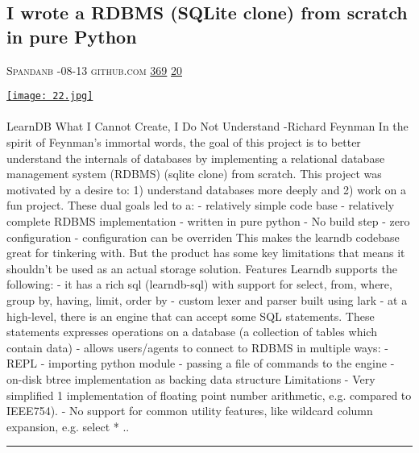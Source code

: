 \documentclass[10pt,a4paper]{article}
\begin{document}
\begin{multicols}{2}
\begin{minipage}{\linewidth}
\subsection{I wrote a RDBMS (SQLite clone) from scratch in pure Python}
\textsc{\footnotesize
{\scriptsize\faUser}\space 
Spandanb 
{\scriptsize\faCalendar}-08-13 
{\scriptsize\faGithub}\space 
github.com 
{\scriptsize\faThumbsOUp}\space 
\href{http://news.ycombinator.com/item?id=37114141\&utm\_term=comment}{369} 
{\scriptsize\faComments}\space 
\href{http://news.ycombinator.com/item?id=37114141\&utm\_term=comment}{20} 
}
\par\medskip\noindent
\href{https://github.com/spandanb/learndb-py?utm\_source=hackernewsletter\&utm\_medium=email\&utm\_term=code}{
    \texttt{[image: 22.jpg]}
}
\end{minipage}
\paragraph{}
LearnDB
What I Cannot Create, I Do Not Understand -Richard Feynman
In the spirit of Feynman's immortal words, the goal of this project is to better understand the internals of databases by implementing a relational database management system (RDBMS) (sqlite clone) from scratch.
This project was motivated by a desire to: 1) understand databases more deeply and 2) work on a fun project. These dual goals led to a:
- relatively simple code base
- relatively complete RDBMS implementation
- written in pure python
- No build step
- zero configuration
- configuration can be overriden
This makes the learndb codebase great for tinkering with. But the product has some key limitations that means it shouldn't be used as an actual storage solution.
Features
Learndb supports the following:
- it has a rich sql (learndb-sql) with support for
select, from, where, group by, having, limit, order by
- custom lexer and parser built using
lark
- at a high-level, there is an engine that can accept some SQL statements. These statements expresses operations on a database (a collection of tables which contain data)
- allows users/agents to connect to RDBMS in multiple ways:
- REPL
- importing python module
- passing a file of commands to the engine
- on-disk btree implementation as backing data structure
Limitations
- Very simplified 1 implementation of floating point number arithmetic, e.g. compared to IEEE754).
- No support for common utility features, like wildcard column expansion, e.g.
select * ..
\par\noindent\textcolor{red}{\rule{\linewidth}{0.2mm}}
\vfill
\null
\noindent\begin{minipage}{\linewidth}

\end{minipage}
\end{multicols}
\end{document}
